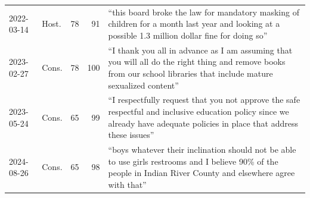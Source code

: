 \begin{table}[H]
\begin{tabularx}{\linewidth}{@{}l l r r X@{}}
2022-03-14 & Host. & 78 & 91 & ``this board broke the law for mandatory masking of children for a month last year and looking at a possible 1.3 million dollar fine for doing so'' \\[2pt]
2023-02-27 & Cons. & 78 & 100 & ``I thank you all in advance as I am assuming that you will all do the right thing and remove books from our school libraries that include mature sexualized content'' \\[2pt]
2023-05-24 & Cons. & 65 & 99 & ``I respectfully request that you not approve the safe respectful and inclusive education policy since we already have adequate policies in place that address these issues'' \\[2pt]
2024-08-26 & Cons. & 65 & 98 & ``boys whatever their inclination should not be able to use girls restrooms and I believe 90\% of the people in Indian River County and elsewhere agree with that'' \\[2pt]
\bottomrule
\end{tabularx}
\end{table}
